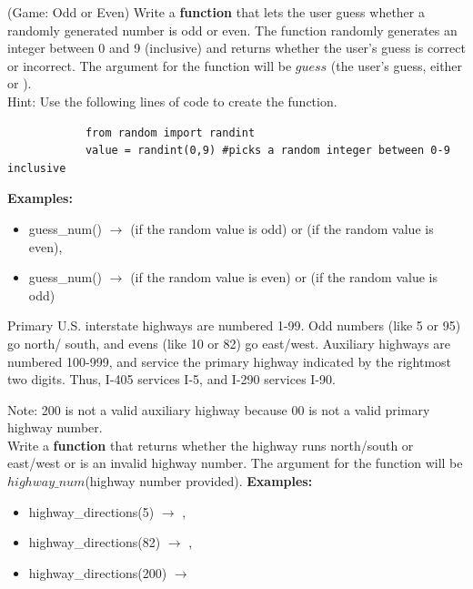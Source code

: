 	\item 
		(Game: Odd or Even)  Write a \textbf{function} that lets the user guess whether a randomly generated number is odd or even. 
		The function randomly generates an integer between 0 and 9 (inclusive) and returns whether the user's guess is correct or incorrect. 
		The argument for the function will be $guess$ (the user's guess, either  or ).\\
		Hint: Use the following lines of code to create the function.
		\begin{verbatim}
		    from random import randint
		    value = randint(0,9) #picks a random integer between 0-9 inclusive
		\end{verbatim}
		\textbf{Examples:}
		\begin{itemize}
			\item  guess\_num() $\rightarrow$  (if the random value is odd) or  (if the random value is even), 
			\item  guess\_num() $\rightarrow$  (if the random value is even) or  (if the random value is odd) 
		\end{itemize}




	\item 
		Primary U.S. interstate highways are numbered 1-99.  Odd numbers (like 5 or 95) go north/
		south, and evens (like 10 or 82) go east/west.  Auxiliary highways are numbered 100-999, and 
		service the primary highway indicated by the rightmost two digits.  Thus, I-405 services 
		I-5, and I-290 services I-90.
		
		Note: 200 is not a valid auxiliary highway because 00 is not a valid primary highway 
		number.\\
		
		Write a \textbf{function} that returns whether the highway runs north/south or east/west or is an invalid highway number. The argument for the function 
		will be $highway\_num$(highway number provided).
		\textbf{Examples:}		
		\begin{itemize}
			\item  highway\_directions(5) $\rightarrow$ , 
			\item  highway\_directions(82) $\rightarrow$ , 
			\item  highway\_directions(200) $\rightarrow$  
		\end{itemize}

